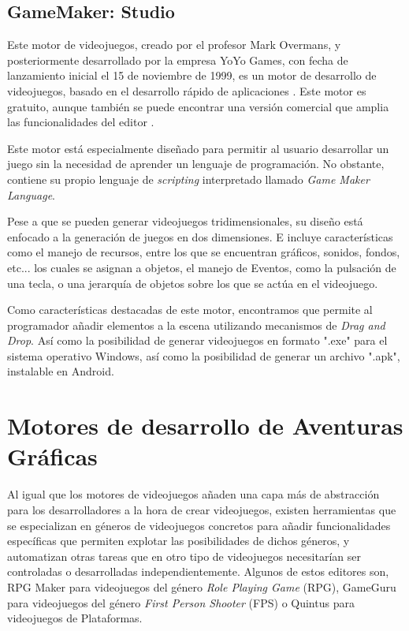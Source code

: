 \subsection{GameMaker: Studio}

Este motor de videojuegos, creado por el profesor Mark Overmans, y posteriormente desarrollado por la empresa YoYo Games, con fecha de lanzamiento inicial el 15 de noviembre de 1999, es un motor de desarrollo de videojuegos, basado en el desarrollo rápido de aplicaciones \cite{gamemaker}. Este motor es gratuito, aunque también se puede encontrar una versión comercial que amplia las funcionalidades del editor \cite{gamemaker}.

Este motor está especialmente diseñado para permitir al usuario desarrollar un juego sin la necesidad de aprender un lenguaje de programación. No obstante, contiene su propio lenguaje de \textit{scripting} interpretado llamado \textit{Game Maker Language}.

Pese a que se pueden generar videojuegos tridimensionales, su diseño está enfocado a la generación de juegos en dos dimensiones. E incluye características como el manejo de recursos, entre los que se encuentran gráficos, sonidos, fondos, etc... los cuales se asignan a objetos, el manejo de Eventos, como la pulsación de una tecla, o una jerarquía de objetos sobre los que se actúa en el videojuego.

Como características destacadas de este motor, encontramos que permite al programador añadir elementos a la escena utilizando mecanismos de \textit{Drag and Drop}. Así como la posibilidad de generar videojuegos en formato ".exe" para el sistema operativo Windows, así como la posibilidad de generar un archivo ".apk", instalable en Android.

\section{Motores de desarrollo de Aventuras Gráficas}
\label{herramientasaventuras}

Al igual que los motores de videojuegos añaden una capa más de abstracción para los desarrolladores a la hora de crear videojuegos, existen herramientas que se especializan en géneros de videojuegos concretos para añadir funcionalidades específicas que permiten explotar las posibilidades de dichos géneros, y automatizan otras tareas que en otro tipo de videojuegos necesitarían ser controladas o desarrolladas independientemente. Algunos de estos editores son, RPG Maker \cite{rpgmaker} para videojuegos del género \textit{Role Playing Game} (RPG), GameGuru \cite{gameguru} para videojuegos del género \textit{First Person Shooter} (FPS) o Quintus \cite{quintus} para videojuegos de Plataformas.

